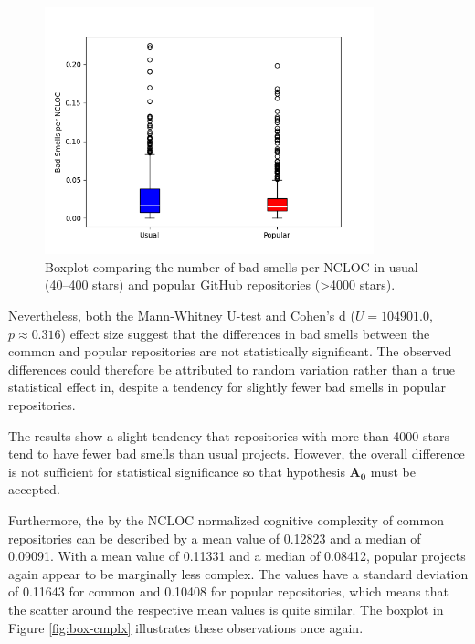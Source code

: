 \documentclass[a4paper, 12pt]{article}
\begin{document}
\begin{figure}[h]
  \centering
  \includegraphics[width=0.85\textwidth]{../media/smells-boxplot.png}
  \caption{Boxplot comparing the number of bad smells per NCLOC in usual (40--400 stars) and popular GitHub repositories (>4000 stars).}
  \label{fig:box-smells}
\end{figure}

Nevertheless, both the Mann-Whitney U-test and Cohen's d ($U = 104901.0$, $p \approx 0.316$) effect size suggest that the differences in bad smells between the common and popular repositories are not statistically significant. The observed differences could therefore be attributed to random variation rather than a true statistical effect in, despite a tendency for slightly fewer bad smells in popular repositories.

\vspace{0.5em}
\begin{leftbar}
The results show a slight tendency that repositories with more than 4000 stars tend to have fewer bad smells than usual projects. However, the overall difference is not sufficient for statistical significance so that hypothesis $\mathbf{A_0}$ must be accepted.
\end{leftbar}
\vspace{0.5em}

Furthermore, the by the NCLOC normalized cognitive complexity of common repositories can be described by a mean value of 0.12823 and a median of 0.09091. With a mean value of 0.11331 and a median of 0.08412, popular projects again appear to be marginally less complex. The values have a standard deviation of 0.11643 for common and 0.10408 for popular repositories, which means that the scatter around the respective mean values is quite similar. The boxplot in Figure \ref{fig:box-cmplx} illustrates these observations once again.\\
\end{document}
